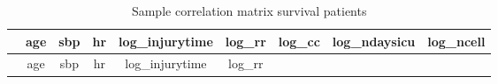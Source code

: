 \documentclass[
]{article}
\begin{document}
\begin{longtable}[]{@{}lcccccccc@{}}
\caption{Sample correlation matrix survival patients}\tabularnewline
\toprule
\begin{minipage}[b]{0.10\columnwidth}\raggedright
\strut
\end{minipage} & \begin{minipage}[b]{0.08\columnwidth}\centering
age\strut
\end{minipage} & \begin{minipage}[b]{0.08\columnwidth}\centering
sbp\strut
\end{minipage} & \begin{minipage}[b]{0.08\columnwidth}\centering
hr\strut
\end{minipage} & \begin{minipage}[b]{0.10\columnwidth}\centering
log\_injurytime\strut
\end{minipage} & \begin{minipage}[b]{0.08\columnwidth}\centering
log\_rr\strut
\end{minipage} & \begin{minipage}[b]{0.08\columnwidth}\centering
log\_cc\strut
\end{minipage} & \begin{minipage}[b]{0.09\columnwidth}\centering
log\_ndaysicu\strut
\end{minipage} & \begin{minipage}[b]{0.08\columnwidth}\centering
log\_ncell\strut
\end{minipage}\tabularnewline
\midrule
\endfirsthead
\toprule
\begin{minipage}[b]{0.10\columnwidth}\raggedright
\strut
\end{minipage} & \begin{minipage}[b]{0.08\columnwidth}\centering
age\strut
\end{minipage} & \begin{minipage}[b]{0.08\columnwidth}\centering
sbp\strut
\end{minipage} & \begin{minipage}[b]{0.08\columnwidth}\centering
hr\strut
\end{minipage} & \begin{minipage}[b]{0.10\columnwidth}\centering
log\_injurytime\strut
\end{minipage} & \begin{minipage}[b]{0.08\columnwidth}\centering
log\_rr\strut
\end{minipage} & \begin{minipage}[b]{0.08\columnwidth}\centering

\end{minipage}
\end{longtable}
\end{document}
